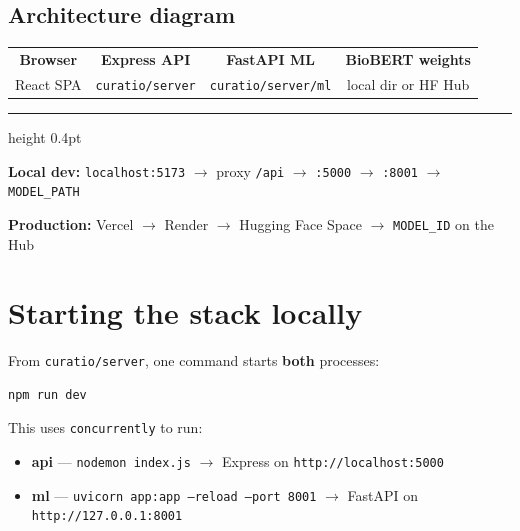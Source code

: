 \documentclass[11pt]{article}
\newcommand{\route}[1]{{\small\texttt{\textcolor{mutel}{#1}}}}
\begin{document}
\subsection{Architecture diagram}

\begin{center}
\begin{tcolorbox}[width=0.95\textwidth, colback=white, colframe=forest, arc=4pt, boxrule=0.8pt]
\small
\begin{tabular}{@{}c@{\quad$\longrightarrow$\quad}c@{\quad$\longrightarrow$\quad}c@{\quad$\longrightarrow$\quad}c@{}}
\textbf{Browser} &
\textbf{Express API} &
\textbf{FastAPI ML} &
\textbf{BioBERT weights} \\[-2pt]
{\footnotesize React SPA} &
{\footnotesize \route{curatio/server}} &
{\footnotesize \route{curatio/server/ml}} &
{\footnotesize local dir or HF Hub} \\
\end{tabular}

\vspace{0.6em}
\hrule height 0.4pt
\vspace{0.4em}

\textbf{Local dev:}\quad
\texttt{localhost:5173} $\to$ proxy \texttt{/api} $\to$ \texttt{:5000} $\to$ \texttt{:8001} $\to$ \texttt{MODEL\_PATH}

\vspace{0.3em}

\textbf{Production:}\quad
Vercel $\to$ Render $\to$ Hugging Face Space $\to$ \texttt{MODEL\_ID} on the Hub
\end{tcolorbox}
\end{center}

\section{Starting the stack locally}

From \route{curatio/server}, one command starts \textbf{both} processes:

\begin{lstlisting}
npm run dev
\end{lstlisting}

This uses \texttt{concurrently} to run:
\begin{itemize}
  \item \textbf{api} --- \texttt{nodemon index.js} $\to$ Express on \texttt{http://localhost:5000}
  \item \textbf{ml} --- \texttt{uvicorn app:app --reload --port 8001} $\to$ FastAPI on \texttt{http://127.0.0.1:8001}
\end{itemize}
\end{document}

